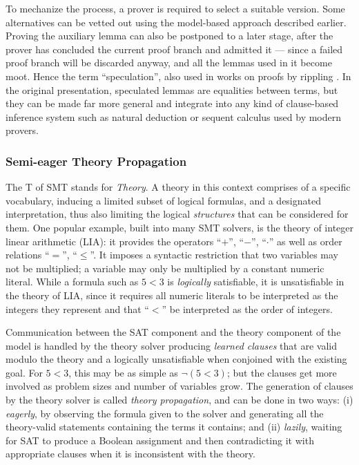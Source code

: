 To mechanize the process, a prover is required to select a suitable version.
Some alternatives can be vetted out using the model-based approach described
earlier.
Proving the auxiliary lemma can also be postponed to a later stage, after the
prover has concluded the current proof branch and admitted it --- since a failed
proof branch will be discarded anyway, and all the lemmas used in it become
moot.
Hence the term ``speculation'', also used in works on proofs by rippling \cite{}.
In the original presentation, speculated lemmas are equalities between terms,
but they can be made far more general and integrate
into any kind of clause-based inference system such as natural deduction or
sequent calculus used by modern provers.


\subsubsection{Semi-eager Theory Propagation}

The T of SMT stands for \emph{Theory}.
A theory in this context comprises of a specific vocabulary, inducing a limited
subset of logical formulas, and a designated interpretation, thus also limiting
the logical \emph{structures} that can be considered for them.
One popular example, built into many SMT solvers, is the theory of integer linear
arithmetic (LIA): it provides the operators ``$+$'', ``$-$'', ``$\cdot$'' as
well as order relations ``$=$'', ``$\leq$''.
It imposes a syntactic restriction that two variables may not be multiplied;
a variable may only be multiplied by a constant numeric literal.
While a formula such as $5 < 3$ is \emph{logically} satisfiable, it is
unsatisfiable in the theory of LIA, since it requires all numeric literals to
be interpreted as the integers they represent and that ``$<$'' be interpreted
as the order of integers.

Communication between the SAT component and the theory component of the model
is handled by the theory solver producing \emph{learned clauses} that are valid
modulo the theory and a logically unsatisfiable when conjoined with the existing
goal.
For $5 < 3$, this may be as simple as $\lnot(5 < 3)$; but the clauses get more
involved as problem sizes and number of variables grow.
The generation of clauses by the theory solver is called
\emph{theory propagation}, and can be done in two ways: (i) \emph{eagerly}, by
observing the formula given to the solver and generating all the theory-valid
statements containing the terms it contains; and (ii) \emph{lazily}, waiting for
SAT to produce a Boolean assignment and then contradicting it with
appropriate clauses when it is inconsistent with the theory.


